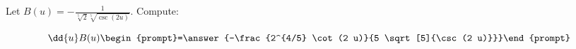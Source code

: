\documentclass{ximera}
\author{Bart Snapp}
\begin{document}
\begin{exercise}
Let $B(u) = -\frac{1}{\sqrt[5]{2} \sqrt[5]{\csc (2 u)}}$. Compute:

\[
\dd{u}B(u)
\begin{prompt}=\answer{-\frac{2^{4/5} \cot (2 u)}{5 \sqrt[5]{\csc (2 u)}}}\end{prompt}
\]
\end{exercise}
\end{document}
